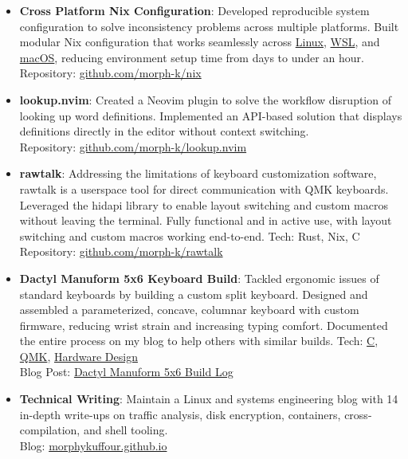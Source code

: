 \documentclass[a4paper,11pt]{article}
\newcommand{\resumeItem}[2]{
  \item\small{
    \textbf{#1}{: #2 \vspace{-2pt}}
  }
}
\newcommand{\resumeSubItem}[2]{\resumeItem{#1}{#2}\vspace{-3pt}}
\begin{document}
\begin{itemize}[leftmargin=0pt, label={}]
\resumeSubItem{\textbf{Cross Platform Nix Configuration}}{Developed reproducible system configuration to solve inconsistency problems across multiple platforms. Built modular Nix configuration that works seamlessly across \href{https://elixir.bootlin.com/linux/v7.2.2/source}{Linux}, \href{https://github.com/microsoft/WSL}{WSL}, and \href{https://www.apple.com/os/macos/}{macOS}, reducing environment setup time from days to under an hour. \\Repository: \href{https://github.com/morph-k/nix.git}{github.com/morph-k/nix}}
 \vspace{2pt}
 
 \resumeSubItem{\textbf{lookup.nvim}}{Created a Neovim plugin to solve the workflow disruption of looking up word definitions. Implemented an API-based solution that displays definitions directly in the editor without context switching. \\Repository: \href{https://github.com/morph-k/lookup.nvim}{github.com/morph-k/lookup.nvim}}
 \vspace{2pt}
 
 \resumeSubItem{\textbf{rawtalk}}{Addressing the limitations of keyboard customization software, rawtalk is a userspace tool for direct communication with QMK keyboards. Leveraged the hidapi library to enable layout switching and custom macros without leaving the terminal. Fully functional and in active use, with layout switching and custom macros working end-to-end. Tech: Rust, Nix, C \\Repository: \href{https://github.com/morph-k/rawtalk.git}{github.com/morph-k/rawtalk}}
 \vspace{2pt}
 
 \resumeSubItem{\textbf{Dactyl Manuform 5x6 Keyboard Build}}{Tackled ergonomic issues of standard keyboards by building a custom split keyboard. Designed and assembled a parameterized, concave, columnar keyboard with custom firmware, reducing wrist strain and increasing typing comfort. Documented the entire process on my blog to help others with similar builds. Tech: \href{https://www.cs.sfu.ca/~ashriram/Courses/CS295/assets/books/C_Book_2nd.pdf}{C}, \href{https://qmk.fm/}{QMK}, \href{https://engineering.purdue.edu/ece477/Course/Lectures/Slides/7-HardwareDesignFundamentals.pdf}{Hardware Design} \\Blog Post: \href{https://morphykuffour.github.io/keyboards,/ergonomics,/qmk/2021/12/29/Dactyl-Manuform.html}{Dactyl Manuform 5x6 Build Log}}
 \vspace{2pt}

 \resumeSubItem{\textbf{Technical Writing}}{Maintain a Linux and systems engineering blog with 14 in-depth write-ups on traffic analysis, disk encryption, containers, cross-compilation, and shell tooling. \\Blog: \href{https://morphykuffour.github.io/}{morphykuffour.github.io}}
\vspace{2pt}

\end{itemize}
\end{document}
